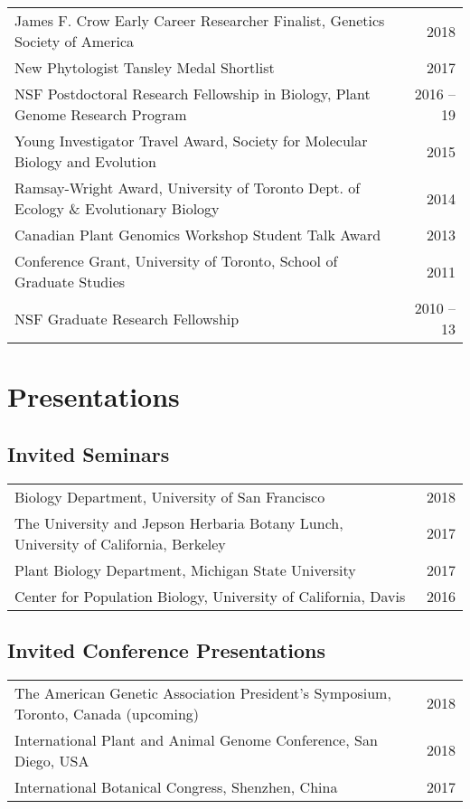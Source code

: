 \documentclass[letterpaper]{article}
\begin{document}
\begin{tabular}{MN}
James F. Crow Early Career Researcher Finalist, Genetics Society of America & 2018 \\
New Phytologist Tansley Medal Shortlist & 2017 \\
NSF Postdoctoral Research Fellowship in Biology, Plant Genome Research Program & 2016 -- 19\\
Young Investigator Travel Award, Society for Molecular Biology and Evolution &  2015\\
Ramsay-Wright Award, University of Toronto Dept. of Ecology \& Evolutionary Biology & 2014\\
Canadian Plant Genomics Workshop Student Talk Award & 2013 \\
Conference Grant, University of Toronto, School of Graduate Studies  & 2011\\
NSF Graduate Research Fellowship&2010 -- 13
\end{tabular}
\section*{Presentations}
\subsection*{Invited Seminars}
\begin{tabular}{MN}
Biology Department, University of San Francisco & 2018\\
The University and Jepson Herbaria Botany Lunch, University of California, Berkeley & 2017 \\
Plant Biology Department, Michigan State University & 2017 \\
Center for Population Biology, University of California, Davis & 2016 \\
\end{tabular}

\subsection*{Invited Conference Presentations}
\begin{tabular}{MN}
The American Genetic Association President's Symposium, Toronto, Canada (upcoming) & 2018\\
International Plant and Animal Genome Conference, San Diego, USA & 2018\\
International Botanical Congress, Shenzhen, China & 2017
\end{tabular}
\end{document}
